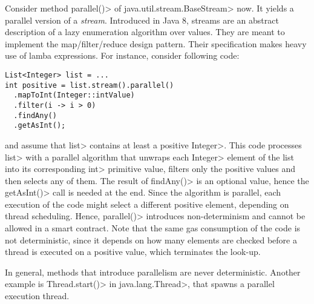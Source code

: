 Consider method \<parallel()> of \<java.util.stream.BaseStream> now.
It yields a parallel version of a \emph{stream}. Introduced in Java 8, streams are
an abstract description of a lazy enumeration algorithm over values.
They are meant to implement the map/filter/reduce design pattern. Their specification
makes heavy use of lamba expressions. For instance, consider following code:
%
\begin{verbatim}
List<Integer> list = ...
int positive = list.stream().parallel()
  .mapToInt(Integer::intValue)
  .filter(i -> i > 0)
  .findAny()
  .getAsInt();
\end{verbatim}
%
and assume that \<list> contains at least a positive \<Integer>.
This code processes \<list> with a parallel algorithm
that unwraps each \<Integer> element of the list into its corresponding \<int> primitive value,
filters only the positive values and then selects any of them.
The result of \<findAny()> is an optional value, hence the
\<getAsInt()> call is needed at the end. Since the algorithm is
parallel, each execution of the code might select a different
positive element, depending on thread scheduling. Hence, \<parallel()>
introduces non-determinism and
cannot be allowed in a smart contract. Note that the same gas consumption
of the code is not deterministic, since it depends on how many elements
are checked before a thread is executed on a positive value, which terminates
the look-up.

In general, methods that introduce parallelism are never deterministic.
Another example is \<Thread.start()> in \<java.lang.Thread>, that spawns
a parallel execution thread.

